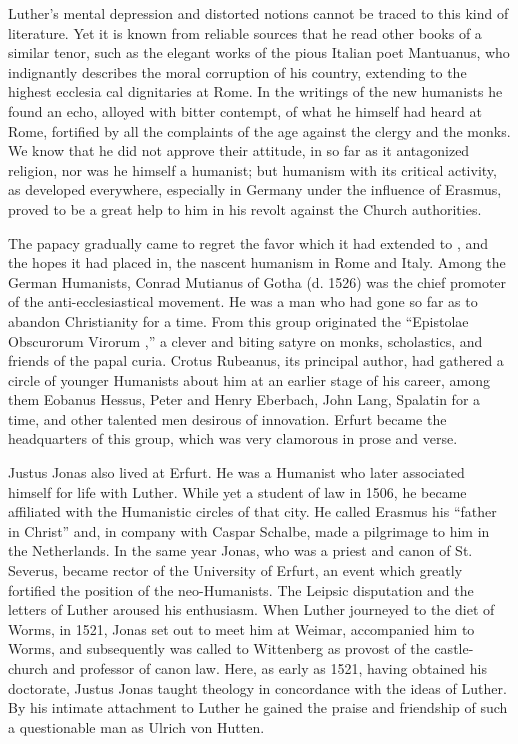 Luther’s mental depression and distorted notions cannot be traced
to this kind of literature. Yet it is known from reliable sources that
he read other books of a similar tenor, such as the elegant works
of the pious Italian poet Mantuanus, who indignantly describes the moral
corruption of his country, extending to the highest ecclesia
cal dignitaries at Rome. In the writings of the new humanists he
found an echo, alloyed with bitter contempt, of what he himself
had heard at Rome, fortified by all the complaints of the age against
the clergy and the monks. We know that he did not approve their
attitude, in so far as it antagonized religion, nor was he himself a
humanist; but humanism with its critical activity, as developed everywhere,
especially in Germany under the influence of Erasmus, proved
to be a great help to him in his revolt against the Church authorities.

The papacy gradually came to regret the favor which it had extended to
, and the hopes it had placed in, the nascent humanism
in Rome and Italy. Among the German Humanists, Conrad Mutianus
of Gotha (d. 1526) was the chief promoter of the anti-ecclesiastical
movement. He was a man who had gone so far as to abandon Christianity
for a time. From this group originated the “Epistolae Obscurorum Virorum
,” a clever and biting satyre on monks, scholastics, and
friends of the papal curia. Crotus Rubeanus, its principal author,
had gathered a circle of younger Humanists about him at an earlier
stage of his career, among them Eobanus Hessus, Peter and Henry
Eberbach, John Lang, Spalatin for a time, and other talented men
desirous of innovation. Erfurt became the headquarters of this
group, which was very clamorous in prose and verse.

Justus Jonas also lived at Erfurt. He was a Humanist who later
associated himself for life with Luther. While yet a student of law
in 1506, he became affiliated with the Humanistic circles of that
city. He called Erasmus his “father in Christ” and, in company
with Caspar Schalbe, made a pilgrimage to him in the Netherlands.
In the same year Jonas, who was a priest and canon of St. Severus,
became rector of the University of Erfurt, an event which greatly
fortified the position of the neo-Humanists. The Leipsic disputation and
the letters of Luther aroused his enthusiasm. When Luther
journeyed to the diet of Worms, in 1521, Jonas set out to meet him
at Weimar, accompanied him to Worms, and subsequently was
called to Wittenberg as provost of the castle-church and professor
of canon law. Here, as early as 1521, having obtained his doctorate,
Justus Jonas taught theology in concordance with the ideas of Luther.
By his intimate attachment to Luther he gained the praise and friendship
of such a questionable man as Ulrich von Hutten.

